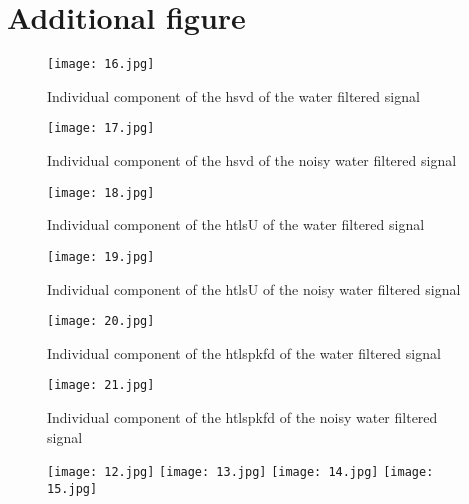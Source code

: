 \section{Additional figure}


\begin{figure}[!htbp]
\centering
\texttt{[image: 16.jpg]}
\caption{Individual component of the hsvd of the water filtered signal}
\end{figure}

\begin{figure}[!htbp]
\centering
\texttt{[image: 17.jpg]}
\caption{Individual component of the hsvd of the noisy water filtered signal}
\end{figure}

\begin{figure}[!htbp]
\centering
\texttt{[image: 18.jpg]}
\caption{Individual component of the htlsU of the water filtered signal}
\end{figure}

\begin{figure}[!htbp]
\centering
\texttt{[image: 19.jpg]}
\caption{Individual component of the htlsU of the noisy water filtered signal}
\end{figure}

\begin{figure}[!htbp]
\centering
\texttt{[image: 20.jpg]}
\caption{Individual component of the htlspkfd of the water filtered signal}
\end{figure}

\begin{figure}[!htbp]
\centering
\texttt{[image: 21.jpg]}
\caption{Individual component of the htlspkfd of the noisy water filtered signal}
\end{figure}



\begin{figure}[!htbp]
%
\centering
\texttt{[image: 12.jpg]}
\subcaption{}
\endminipage\hfill
{}%
\centering
\texttt{[image: 13.jpg]}
\subcaption{}
\endminipage\hfill
{}%
\centering
\texttt{[image: 14.jpg]}
\subcaption{}
\endminipage\hfill
{}%
\centering
\texttt{[image: 15.jpg]}
\subcaption{}
\endminipage\hfill
\caption{}
\end{figure}







